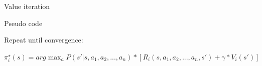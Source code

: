 \documentclass[aspectratio=169,xcolor=dvipsnames]{beamer}
\begin{document}
\begin{frame}{Value iteration}
    \begin{center}
        \scriptsize
        \begin{minipage}{0.85\textwidth} 
            \begin{block}{Pseudo code}
                \begin{algorithm}[H]
                    \DontPrintSemicolon
                    
                    
                    Repeat until convergence:
                    
                    \Return $\pi_i^\star(s) = \displaystyle arg\max_{a} P(s' | s, a_1, a_2, ..., a_n) * [R_i(s, a_1, a_2, ..., a_n, s') + \gamma * V_i(s')]$
                \end{algorithm} 
            \end{block}
        \end{minipage}
    \end{center}
    

\end{frame}
\end{document}
